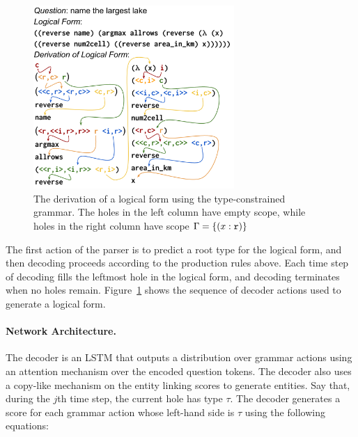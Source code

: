 \begin{figure}
\centering
\includegraphics[width=3in]{figures/nnsp_example_derivation.png}
\caption{The derivation of a logical form using the  type-constrained grammar. 
The holes in the left column have 
empty scope, while holes in the right column have scope $\Gamma = \{(x : 
\mathtt{r})\}$}
\label{fig:grammar_derivation}
\end{figure}

The first action of the parser is to predict a root type for the logical form, 
and then decoding proceeds according to the production rules above.
Each time step of decoding fills the leftmost hole in the logical form, and 
decoding terminates when no holes remain.
Figure~\ref{fig:grammar_derivation} shows the sequence of decoder actions used 
to generate a logical form.

\paragraph{Network Architecture.} The decoder is an LSTM that outputs a 
distribution over grammar actions using an attention mechanism over the encoded 
question tokens. The decoder also uses a copy-like mechanism on the entity 
linking scores to generate entities.
Say that, during the $j$th time step, the current hole has type $\tau$. The 
decoder generates a score for each grammar action whose left-hand side is 
$\tau$ using the following equations:

